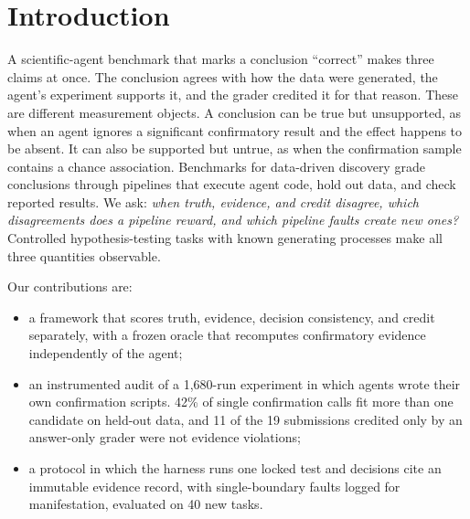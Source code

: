 \section{Introduction}
\label{sec:introduction}
A scientific-agent benchmark that marks a conclusion ``correct'' makes three
claims at once. The conclusion agrees with how the data were generated, the
agent's experiment supports it, and the grader credited it for that reason.
These are different measurement objects. A conclusion can be true but
unsupported, as when an agent ignores a significant confirmatory result and
the effect happens to be absent. It can also be supported but untrue, as when
the confirmation sample contains a chance association. Benchmarks for
data-driven discovery
\citep{chen2025scienceagentbench,majumder2025discoverybench,wang2026firebench,lu2024aiscientist}
grade conclusions through pipelines that execute agent code, hold out data,
and check reported results. We ask: \emph{when truth, evidence, and credit
disagree, which disagreements does a pipeline reward, and which pipeline
faults create new ones?} Controlled hypothesis-testing tasks with known
generating processes make all three quantities observable.

Our contributions are:
\begin{itemize}
\item a framework that scores truth, evidence, decision consistency, and
credit separately, with a frozen oracle that recomputes confirmatory evidence
independently of the agent;
\item an instrumented audit of a 1,680-run experiment in which agents wrote
their own confirmation scripts. 42\% of single confirmation calls fit more
than one candidate on held-out data, and 11 of the 19 submissions credited
only by an answer-only grader were not evidence violations;
\item a protocol in which the harness runs one locked test and decisions cite
an immutable evidence record, with single-boundary faults logged for
manifestation, evaluated on 40 new tasks.
\end{itemize}

